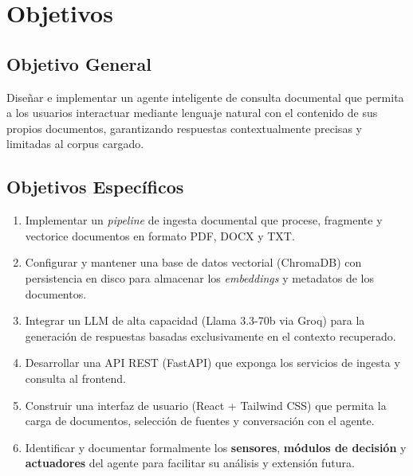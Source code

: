 \documentclass[12pt,a4paper]{article}
\begin{document}
\section{Objetivos}

\subsection{Objetivo General}

Diseñar e implementar un agente inteligente de consulta documental que permita a los usuarios interactuar mediante lenguaje natural con el contenido de sus propios documentos, garantizando respuestas contextualmente precisas y limitadas al corpus cargado.

\subsection{Objetivos Específicos}

\begin{enumerate}[leftmargin=1.5cm]
  \item Implementar un \textit{pipeline} de ingesta documental que procese, fragmente y vectorice documentos en formato PDF, DOCX y TXT.
  \item Configurar y mantener una base de datos vectorial (ChromaDB) con persistencia en disco para almacenar los \textit{embeddings} y metadatos de los documentos.
  \item Integrar un LLM de alta capacidad (Llama 3.3-70b via Groq) para la generación de respuestas basadas exclusivamente en el contexto recuperado.
  \item Desarrollar una API REST (FastAPI) que exponga los servicios de ingesta y consulta al frontend.
  \item Construir una interfaz de usuario (React + Tailwind CSS) que permita la carga de documentos, selección de fuentes y conversación con el agente.
  \item Identificar y documentar formalmente los \textbf{sensores}, \textbf{módulos de decisión} y \textbf{actuadores} del agente para facilitar su análisis y extensión futura.
\end{enumerate}

\end{document}
